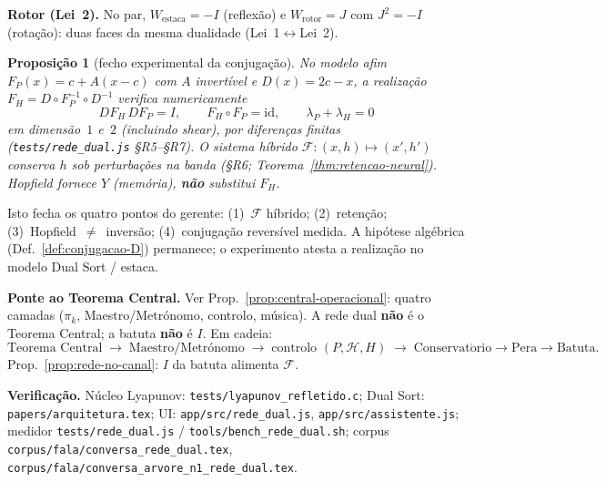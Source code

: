 \documentclass[11pt,a4paper]{article}
\newtheorem{proposicao}{Proposição}
\newcommand{\code}[1]{\texttt{#1}}
\begin{document}
\noindent \textbf{Rotor (Lei~2).} No par,
$W_{\mathrm{estaca}}=-I$ (reflexão) e
$W_{\mathrm{rotor}}=J$ com $J^{2}=-I$ (rotação): duas faces da mesma
dualidade (Lei~1$\leftrightarrow$Lei~2).

\begin{proposicao}[fecho experimental da conjugação]\label{prop:fecho-conj-exp}
No modelo afim $F_P(x)=c+A(x-c)$ com $A$ invertível e
$D(x)=2c-x$, a realização
$F_H=D\circ F_P^{-1}\circ D^{-1}$ verifica numericamente
\[
\boxed{DF_H\,DF_P=I},
\qquad
\boxed{F_H\circ F_P=\mathrm{id}},
\qquad
\boxed{\lambda_P+\lambda_H=0}
\]
em dimensão~$1$ e~$2$ (incluindo shear), por diferenças finitas
(\code{tests/rede\_dual.js} §R5--§R7). O sistema híbrido
$\mathcal{F}\colon(x,h)\mapsto(x',h')$ conserva $h$ sob perturbações
na banda (§R6; Teorema~\ref{thm:retencao-neural}).
Hopfield fornece $Y$ (memória), \textbf{não} substitui $F_H$.
\end{proposicao}

\noindent Isto fecha os quatro pontos do gerente:
(1)~$\mathcal{F}$ híbrido; (2)~retenção; (3)~Hopfield~$\neq$~inversão;
(4)~conjugação reversível medida. A hipótese algébrica
(Def.~\ref{def:conjugacao-D}) permanece; o experimento atesta a
realização no modelo Dual Sort / estaca.

\noindent \textbf{Ponte ao Teorema Central.} Ver
Prop.~\ref{prop:central-operacional}: quatro camadas
($\pi_k$, Maestro/Metrónomo, controlo, música).
A rede dual \textbf{não} é o Teorema Central; a batuta
\textbf{não} é $I$. Em cadeia:
\[
\boxed{
\text{Teorema Central}
\;\longrightarrow\;
\text{Maestro/Metrónomo}
\;\longrightarrow\;
\text{controlo }(P,\mathcal{H},H)
\;\longrightarrow\;
\mathrm{Conservat\acute{o}rio}\!\to\!\mathrm{Pera}\!\to\!\mathrm{Batuta}.
}
\]
Prop.~\ref{prop:rede-no-canal}: $I$ da batuta alimenta $\mathcal{F}$.

\noindent \textbf{Verificação.} Núcleo Lyapunov:
\code{tests/lyapunov\_refletido.c}; Dual Sort:
\code{papers/arquitetura.tex}; UI:
\code{app/src/rede\_dual.js}, \code{app/src/assistente.js};
medidor \code{tests/rede\_dual.js} /
\code{tools/bench\_rede\_dual.sh}; corpus
\code{corpus/fala/conversa\_rede\_dual.tex},
\code{corpus/fala/conversa\_arvore\_n1\_rede\_dual.tex}.
\end{document}
